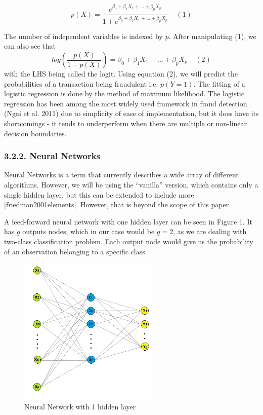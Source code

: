\documentclass[12pt,]{article}
\begin{document}
\[p(X) = \frac{e^{\beta_0 + \beta_1X_1 + ... + \beta_pX_p}}{1 + e^{\beta_0 + \beta_1X_1 + ... + \beta_pX_p}}\;\;\;\;(1)\]

The number of independent variables is indexed by \emph{p}. After
manipulating (1), we can also see that
\[log(\frac{p(X)}{1-p(X)})=\beta_0+ \beta_1X_1 + ... + \beta_pX_p\;\;\;\;(2)\]
with the LHS being called the logit. Using equation (2), we will predict
the probabilities of a transaction being fraudulent i.e. \(p(Y = 1)\).
The fitting of a logistic regression is done by the method of maximum
likelihood. The logistic regression has been among the most widely used
framework in fraud detection (Ngai et al. 2011) due to simplicity of
ease of implementation, but it does have its shortcomings - it tends to
underperform when there are multiple or non-linear decision boundaries.

\hypertarget{neural-networks}{%
\subsubsection{3.2.2. Neural Networks}\label{neural-networks}}

Neural Networks is a term that currently describes a wide array of
different algorithms. However, we will be using the ``vanilla'' version,
which contains only a single hidden layer, but this can be extended to
include more {[}friedman2001elements{]}. However, that is beyond the
scope of this paper.

A feed-forward neural network with one hidden layer can be seen in
Figure 1. It has \(g\) outputs nodes, which in our case would be
\(g=2\), as we are dealing with two-class classification problem. Each
output node would give us the probability of an observation belonging to
a specific class.

\begin{figure}
\centering
\includegraphics[width=0.6\textwidth,height=\textheight]{figures/nnet.png}
\caption{Neural Network with 1 hidden layer}
\end{figure}
\end{document}
